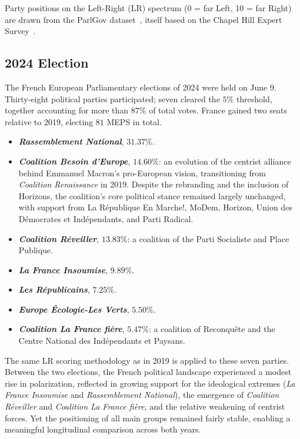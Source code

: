 \documentclass[9pt,sigconf,letterpaper]{acmart}
\newcommand{\RN}{\textsl{Rassemblement National}\xspace}
\newcommand{\LR}{\textsl{Les Républicains}\xspace}
\newcommand{\RENA}{\textsl{Coalition Renaissance}\xspace}
\newcommand{\BESO}{\textsl{Coalition Besoin d'Europe}\xspace}
\newcommand{\EEC}{\textsl{Europe Écologie-Les Verts}\xspace}
\newcommand{\LFI}{\textsl{La France Insoumise}\xspace}
\newcommand{\REVE}{\textsl{Coalition Réveiller}\xspace}
\newcommand{\LFF}{\textsl{Coalition La France fière}\xspace}
\begin{document}
Party positions on the Left-Right (LR) spectrum (0 = far Left, 10 = far Right) are drawn from the ParlGov dataset~\cite{doring2022parliaments,lr_score}, itself based on the Chapel Hill Expert Survey~\cite{eu_open_data_politics}.

\subsection*{2024 Election}

The French European Parliamentary elections of 2024 were held on June 9.
Thirty-eight political parties participated; seven cleared the $5\%$ threshold, together accounting for more than $87\%$ of total votes.
France gained two seats relative to 2019, electing $81$ \ac{MEPS} in total.

\begin{itemize}[noitemsep, topsep=4pt, leftmargin=14pt]
\item \textbf{\RN}, $31.37\%$.
\item \textbf{\BESO}, $14.60\%$: an evolution of the centrist alliance behind Emmanuel Macron's pro-European vision, transitioning from \RENA in 2019.
Despite the rebranding and the inclusion of Horizons, the coalition's core political stance remained largely unchanged, with support from La R\'{e}publique En Marche!, MoDem, Horizon, Union des D\'{e}mocrates et Ind\'{e}pendants, and Parti Radical.
\item \textbf{\REVE}, $13.83\%$: a coalition of the Parti Socialiste and Place Publique.
\item \textbf{\LFI}, $9.89\%$.
\item \textbf{\LR}, $7.25\%$.
\item \textbf{\EEC}, $5.50\%$.
\item \textbf{\LFF}, $5.47\%$: a coalition of Reconqu\^{e}te and the Centre National des Ind\'{e}pendants et Paysans.
\end{itemize}

The same LR scoring methodology as in 2019 is applied to these seven parties.
Between the two elections, the French political landscape experienced a modest rise in polarization, reflected in growing support for the ideological extremes (\LFI and \RN), the emergence of \REVE and \LFF, and the relative weakening of centrist forces.
Yet the positioning of all main groups remained fairly stable, enabling a meaningful longitudinal comparison across both years.

\end{document}
